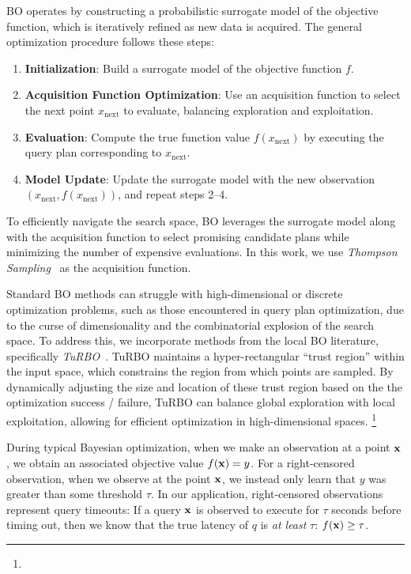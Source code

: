BO operates by constructing a probabilistic surrogate model of the objective function, which is iteratively refined as new data is acquired. The general optimization procedure follows these steps:

\begin{enumerate}[leftmargin=*]
\item \textbf{Initialization}: Build a surrogate model of the objective function $f$.
\item \textbf{Acquisition Function Optimization}: Use an acquisition function to select the next point $x_{\text{next}}$ to evaluate, balancing exploration and exploitation.
\item \textbf{Evaluation}: Compute the true function value $f(x_{\text{next}})$ by executing the query plan corresponding to $x_{\text{next}}$.
\item \textbf{Model Update}: Update the surrogate model with the new observation $(x_{\text{next}}, f(x_{\text{next}}))$, and repeat steps 2--4.
\end{enumerate}

To efficiently navigate the search space, BO leverages the surrogate model along with the acquisition function to select promising candidate plans while minimizing the number of expensive evaluations. In this work, we use \emph{Thompson Sampling}~\cite{thompson} as the acquisition function.

 Standard BO methods can struggle with high-dimensional or discrete optimization problems, such as those encountered in query plan optimization, due to the curse of dimensionality and the combinatorial explosion of the search space. To address this, we incorporate methods from the local BO literature, specifically \emph{TuRBO}~\cite{eriksson2019scalable}. TuRBO maintains a hyper-rectangular ``trust region'' within the input space, which constrains the region from which points are sampled. By dynamically adjusting the size and location of these trust region based on the the optimization success / failure, TuRBO can balance global exploration with local exploitation, allowing for efficient optimization in high-dimensional spaces. \footnote{}

During typical Bayesian optimization, when we make an observation at a point $\mathbf{x}$, we obtain an associated objective value $f(\mathbf{x}) = y$. 
For a right-censored observation, when we observe at the point $\mathbf{x}$, we instead only learn that $y$ was greater than some threshold $\tau$. In our application, right-censored observations represent query timeouts: If a query $\mathbf{x}$ is observed to execute for $\tau$ seconds before timing out, then we know that the true latency of $q$ is \emph{at least} $\tau$: $f(\mathbf{x}) \geq \tau$. 

